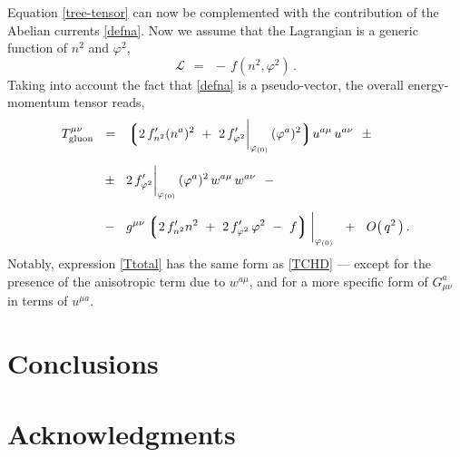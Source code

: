\documentclass[epsfig,12pt]{article}
\def\beq{\begin{equation}}
\def\eeq{\end{equation}}
\newcommand{\mc}[1]{\mathcal{#1}}
\newcommand{\lgr}{\left\lgroup}
\newcommand{\rgr}{\right\rgroup}
\begin{document}
	Equation \eqref{tree-tensor} can now be complemented with the contribution of the Abelian currents \eqref{defna}.
	Now we assume that the Lagrangian is a generic function of $ n^2 $ and $ \varphi^2 $,
\beq
	\mc{L}    ~~=~~    -\, f( n^2, \varphi^2 )\,.
\eeq
	Taking into account the fact that \eqref{defna} is a pseudo-vector, the overall energy-momentum tensor reads,
\begin{align}
%
\notag
	T_\text{gluon}^{\mu\nu}    &
					~~=~~
						\bigl\lgroup 2\, f_{n^2}^\prime (n^a)^2  ~+~
        					2\, f^\prime_{\varphi^2} \bigg|_{\varphi_{(0)}}\, (\varphi^a)^2 \bigr\rgroup
						u^{a\mu}\, u^{a\nu}
					~~\pm~~
	\\[2mm]
%
\label{Ttotal}
	&
					~~\pm~~
						2\, f^\prime_{\varphi^2} \bigg|_{\varphi_{(0)}}\, (\varphi^a)^2\, w^{a\mu}\, w^{a\nu}
					~~-~~
	\\[2mm]
%
\notag
	& 
					~~-~~
					g^{\mu\nu} \lgr
						2\, f_{n^2}^\prime n^2 ~+~ 2\, f^\prime_{\varphi^2}\, \varphi^2
						~-~ f
					\rgr \bigg|_{\varphi_{(0)}}
					~~+~~
					O\big(\, q^2 \,\big)\,.
\end{align}
	Notably, expression \eqref{Ttotal} has the same form as \eqref{TCHD} --- except for the presence
	of the anisotropic term due to $ w^{a\mu} $, and for a more specific form of $ G_{\mu\nu}^a $
	in terms of $ u^{\mu a} $.




\section{Conclusions}




\section*{Acknowledgments}

\small
\begin{thebibliography}{99}
\itemsep -2pt

\end{thebibliography}
\end{document}
